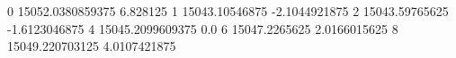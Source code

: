 0 15052.0380859375 6.828125
1 15043.10546875 -2.1044921875
2 15043.59765625 -1.6123046875
4 15045.2099609375 0.0
6 15047.2265625 2.0166015625
8 15049.220703125 4.0107421875
